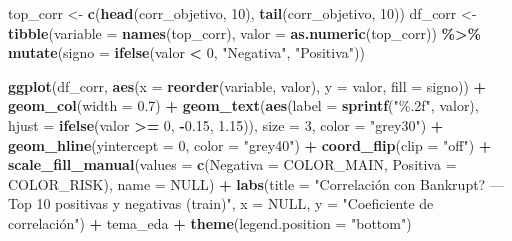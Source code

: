 \documentclass[
]{book}
\newenvironment{Shaded}{\begin{snugshade}}{\end{snugshade}}
\newcommand{\AttributeTok}[1]{\textcolor[rgb]{0.13,0.29,0.53}{#1}}
\newcommand{\ConstantTok}[1]{\textcolor[rgb]{0.56,0.35,0.01}{#1}}
\newcommand{\DecValTok}[1]{\textcolor[rgb]{0.00,0.00,0.81}{#1}}
\newcommand{\FloatTok}[1]{\textcolor[rgb]{0.00,0.00,0.81}{#1}}
\newcommand{\FunctionTok}[1]{\textcolor[rgb]{0.13,0.29,0.53}{\textbf{#1}}}
\newcommand{\NormalTok}[1]{#1}
\newcommand{\OtherTok}[1]{\textcolor[rgb]{0.56,0.35,0.01}{#1}}
\newcommand{\SpecialCharTok}[1]{\textcolor[rgb]{0.81,0.36,0.00}{\textbf{#1}}}
\newcommand{\StringTok}[1]{\textcolor[rgb]{0.31,0.60,0.02}{#1}}
\begin{document}
\begin{Shaded}
\begin{Highlighting}[]
\NormalTok{top\_corr }\OtherTok{\textless{}{-}} \FunctionTok{c}\NormalTok{(}\FunctionTok{head}\NormalTok{(corr\_objetivo, }\DecValTok{10}\NormalTok{), }\FunctionTok{tail}\NormalTok{(corr\_objetivo, }\DecValTok{10}\NormalTok{))}
\NormalTok{df\_corr }\OtherTok{\textless{}{-}} \FunctionTok{tibble}\NormalTok{(}\AttributeTok{variable =} \FunctionTok{names}\NormalTok{(top\_corr), }\AttributeTok{valor =} \FunctionTok{as.numeric}\NormalTok{(top\_corr)) }\SpecialCharTok{\%\textgreater{}\%}
  \FunctionTok{mutate}\NormalTok{(}\AttributeTok{signo =} \FunctionTok{ifelse}\NormalTok{(valor }\SpecialCharTok{\textless{}} \DecValTok{0}\NormalTok{, }\StringTok{"Negativa"}\NormalTok{, }\StringTok{"Positiva"}\NormalTok{))}

\FunctionTok{ggplot}\NormalTok{(df\_corr, }\FunctionTok{aes}\NormalTok{(}\AttributeTok{x =} \FunctionTok{reorder}\NormalTok{(variable, valor), }\AttributeTok{y =}\NormalTok{ valor, }\AttributeTok{fill =}\NormalTok{ signo)) }\SpecialCharTok{+}
  \FunctionTok{geom\_col}\NormalTok{(}\AttributeTok{width =} \FloatTok{0.7}\NormalTok{) }\SpecialCharTok{+}
  \FunctionTok{geom\_text}\NormalTok{(}\FunctionTok{aes}\NormalTok{(}\AttributeTok{label =} \FunctionTok{sprintf}\NormalTok{(}\StringTok{"\%.2f"}\NormalTok{, valor),}
                \AttributeTok{hjust =} \FunctionTok{ifelse}\NormalTok{(valor }\SpecialCharTok{\textgreater{}=} \DecValTok{0}\NormalTok{, }\SpecialCharTok{{-}}\FloatTok{0.15}\NormalTok{, }\FloatTok{1.15}\NormalTok{)),}
            \AttributeTok{size =} \DecValTok{3}\NormalTok{, }\AttributeTok{color =} \StringTok{"grey30"}\NormalTok{) }\SpecialCharTok{+}
  \FunctionTok{geom\_hline}\NormalTok{(}\AttributeTok{yintercept =} \DecValTok{0}\NormalTok{, }\AttributeTok{color =} \StringTok{"grey40"}\NormalTok{) }\SpecialCharTok{+}
  \FunctionTok{coord\_flip}\NormalTok{(}\AttributeTok{clip =} \StringTok{"off"}\NormalTok{) }\SpecialCharTok{+}
  \FunctionTok{scale\_fill\_manual}\NormalTok{(}\AttributeTok{values =} \FunctionTok{c}\NormalTok{(}\AttributeTok{Negativa =}\NormalTok{ COLOR\_MAIN, }\AttributeTok{Positiva =}\NormalTok{ COLOR\_RISK),}
                     \AttributeTok{name =} \ConstantTok{NULL}\NormalTok{) }\SpecialCharTok{+}
  \FunctionTok{labs}\NormalTok{(}\AttributeTok{title =} \StringTok{"Correlación con Bankrupt? — Top 10 positivas y negativas (train)"}\NormalTok{,}
       \AttributeTok{x =} \ConstantTok{NULL}\NormalTok{, }\AttributeTok{y =} \StringTok{"Coeficiente de correlación"}\NormalTok{) }\SpecialCharTok{+}
\NormalTok{  tema\_eda }\SpecialCharTok{+}
  \FunctionTok{theme}\NormalTok{(}\AttributeTok{legend.position =} \StringTok{"bottom"}\NormalTok{)}
\end{Highlighting}
\end{Shaded}
\end{document}
